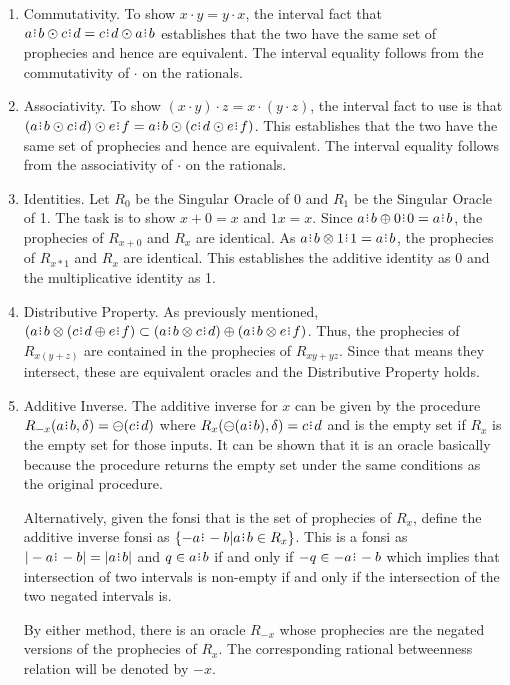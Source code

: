 \documentclass[12pt]{article}
\begin{document}
\begin{enumerate}
    \item Commutativity. To show $x\cdot y = y \cdot x$, the interval fact that $a\rint b \odot c\rint d = c\rint d \odot a\rint b$ establishes that the two have the same set of prophecies and hence are equivalent. The interval equality follows from the commutativity of $\cdot$  on the rationals. 
    \item Associativity. To show $(x\cdot y) \cdot z = x \cdot (y \cdot z)$, the interval fact to use is that $(a\rint b \odot c\rint d) \odot e\rint f = a\rint b \odot (c\rint d \odot e\rint f)$. This establishes that the two have the same set  of prophecies and hence are equivalent. The interval equality follows from the associativity of $\cdot$ on the rationals. 
    \item Identities. Let $R_0$ be the Singular Oracle of 0 and $R_1$ be the Singular Oracle of 1. The task is to show $x+0=x$ and $1x  = x$.  Since $a\rint b \oplus 0\rint 0 = a\rint b$, the prophecies of $R_{x+0}$ and $R_x$ are identical. As $a\rint b \otimes 1\rint 1 = a\rint b$, the prophecies of $R_{x*1}$ and $R_x$ are identical. This establishes the additive identity as 0 and the multiplicative identity as 1. 
    \item Distributive Property. As previously mentioned, $( a\rint b \otimes ( c\rint d \oplus e\rint f) \subset (a\rint b \otimes c\rint d) \oplus (a\rint b \otimes e\rint f)$. Thus, the prophecies of $R_{x(y+z)}$ are contained in the prophecies of $R_{xy + yz}$. Since that means they intersect, these are equivalent oracles and the Distributive Property holds. 
    \item Additive Inverse.  The additive inverse for $x$ can be given by the procedure $R_{-x}(a\rint b, \delta) = \ominus (c\rint d)$ where $R_x (\ominus (a\rint b), \delta) = c\rint d$  and is the empty set if $R_x$ is the empty set for those inputs. It can be shown that it is an oracle basically because the procedure returns the empty set under the same conditions as the original procedure.

    Alternatively, given the fonsi that is the set of prophecies of $R_x$, define the additive inverse fonsi as $\{-a\rint -b| a\rint b \in R_x\}$. This is a fonsi as $|-a\rint -b| = |a\rint b|$ and  $q \in a\rint b$ if and only if $-q \in -a\rint -b$ which implies that intersection of two intervals is non-empty if and only if the intersection of the two negated intervals is. 

    By either method, there is an oracle $R_{-x}$ whose prophecies are the negated versions of the prophecies of $R_x$. The corresponding rational betweenness relation will be denoted by $-x$.
    

\end{enumerate}
\end{document}
